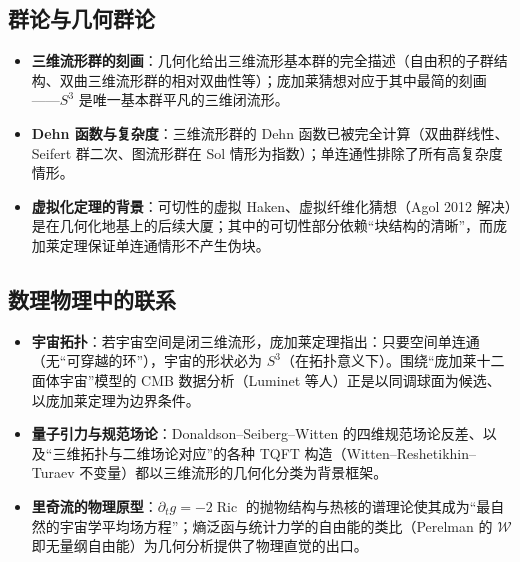 \subsection{群论与几何群论}

\begin{itemize}
    \item \textbf{三维流形群的刻画}：几何化给出三维流形基本群的完全描述（自由积的子群结构、双曲三维流形群的相对双曲性等）；庞加莱猜想对应于其中最简的刻画——$S^3$ 是唯一基本群平凡的三维闭流形。
    \item \textbf{Dehn 函数与复杂度}：三维流形群的 Dehn 函数已被完全计算（双曲群线性、Seifert 群二次、图流形群在 Sol 情形为指数）；单连通性排除了所有高复杂度情形。
    \item \textbf{虚拟化定理的背景}：可切性的虚拟 Haken、虚拟纤维化猜想（Agol 2012 解决）是在几何化地基上的后续大厦；其中的可切性部分依赖“块结构的清晰”，而庞加莱定理保证单连通情形不产生伪块。
\end{itemize}

\subsection{数理物理中的联系}

\begin{itemize}
    \item \textbf{宇宙拓扑}：若宇宙空间是闭三维流形，庞加莱定理指出：只要空间单连通（无“可穿越的环”），宇宙的形状必为 $S^3$（在拓扑意义下）。围绕“庞加莱十二面体宇宙”模型的 CMB 数据分析（Luminet 等人）正是以同调球面为候选、以庞加莱定理为边界条件。
    \item \textbf{量子引力与规范场论}：Donaldson--Seiberg--Witten 的四维规范场论反差、以及“三维拓扑与二维场论对应”的各种 TQFT 构造（Witten--Reshetikhin--Turaev 不变量）都以三维流形的几何化分类为背景框架。
    \item \textbf{里奇流的物理原型}：$\partial_t g = -2\operatorname{Ric}$ 的抛物结构与热核的谱理论使其成为“最自然的宇宙学平均场方程”；熵泛函与统计力学的自由能的类比（Perelman 的 $\mathcal{W}$ 即无量纲自由能）为几何分析提供了物理直觉的出口。
\end{itemize}
